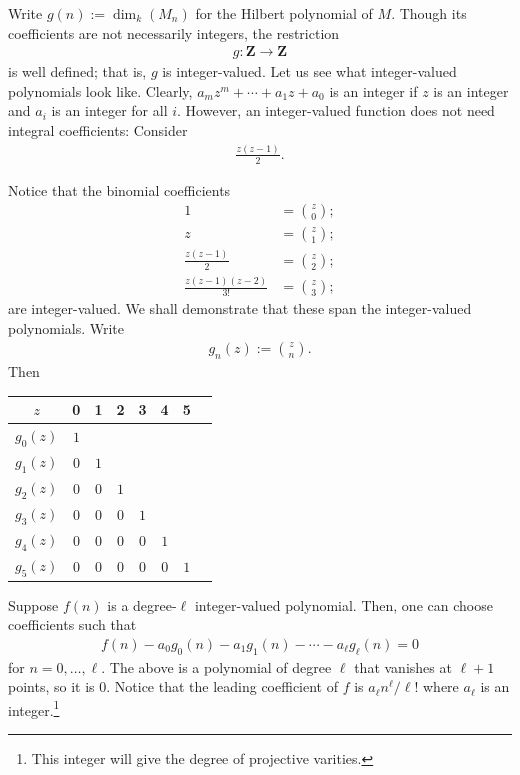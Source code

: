 \documentclass [11 pt, oneside, margin = 1 in] {article}
\begin{document}
Write $g(n) := \dim_k(M_n)$ for the Hilbert polynomial of $M$. Though its coefficients are not necessarily integers, the restriction
\begin{align*}
	g:\mathbf{Z}\longrightarrow \mathbf{Z}
\end{align*}
is well defined; that is, $g$ is integer-valued. Let us see what integer-valued polynomials look like. Clearly, $a_mz^m + \cdots + a_1z + a_0$ is an integer if $z$ is an integer and $a_i$ is an integer for all $i$. However, an integer-valued function does not need integral coefficients: Consider
\begin{align*}
	\frac{z(z-1)}{2}.
\end{align*}

Notice that the binomial coefficients
\begin{align*}
	1 &= \binom{z}{0};\\
	z &= \binom{z}{1};\\
	\frac{z(z-1)}{2} &= \binom{z}{2};\\
	\frac{z(z-1) (z-2)}{3!}&= \binom{z}{3};
\end{align*}
are integer-valued. We shall demonstrate that these span the integer-valued polynomials. Write 
\begin{align*}
	g_n(z) := \binom{z}{n}.
\end{align*}
Then
\begin{center}
	\begin{tabular}{cccccccc}
		$z$&0&1&2&3&4&5\\
    		\midrule
		 $g_0(z)$& $1$ &     &     &    \\
		 $g_1(z)$& $0$ & $1$ &     &    \\
		 $g_2(z)$& $0$ & $0$ & $1$ &    \\
		 $g_3(z)$& $0$ & $0$ & $0$ & $1$\\
		 $g_4(z)$& $0$ & $0$ & $0$ & $0$ & $1$\\
		 $g_5(z)$& $0$ & $0$ & $0$ & $0$ & $0$ & $1$
	\end{tabular}
\end{center}
Suppose $f(n)$ is a degree-$\ell$ integer-valued polynomial. Then, one can choose coefficients such that
\begin{align*}
	f(n) -  a_0g_0(n) -  a_1g_1(n) - \cdots - a_\ell g_\ell (n) =0
\end{align*}
for $n = 0,\hdots, \ell$. The above is a polynomial of degree $\ell$ that vanishes at $\ell + 1$ points, so it is $0$. Notice that the leading coefficient of $f$ is $a_\ell n^\ell / \ell!$ where $a_\ell$ is an integer.\footnote{This integer will give the degree of projective varities.}
\end{document}
